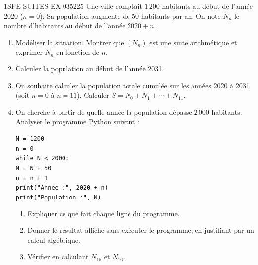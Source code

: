 \begin{exercice}{1SPE-SUITES-EX-035}{2}{25}
Une ville comptait $1\,200$ habitants au début de l'année 2020 ($n = 0$). Sa population augmente de $50$ habitants par an. On note $N_n$ le nombre d'habitants au début de l'année $2020 + n$.

\begin{enumerate}
  \item Modéliser la situation. Montrer que $(N_n)$ est une suite arithmétique et exprimer $N_n$ en fonction de $n$.

  \item Calculer la population au début de l'année 2031.

  \item On souhaite calculer la population totale cumulée sur les années 2020 à 2031 (soit $n = 0$ à $n = 11$). Calculer $S = N_0 + N_1 + \cdots + N_{11}$.

  \item On cherche à partir de quelle année la population dépasse $2\,000$ habitants. Analyser le programme Python suivant :

\medskip
\texttt{N = 1200}\\
\texttt{n = 0}\\
\texttt{while N < 2000:}\\
\hspace*{1.5em}\texttt{N = N + 50}\\
\hspace*{1.5em}\texttt{n = n + 1}\\
\texttt{print("Annee :", 2020 + n)}\\
\texttt{print("Population :", N)}

\medskip
  \begin{enumerate}
    \item Expliquer ce que fait chaque ligne du programme.
    \item Donner le résultat affiché sans exécuter le programme, en justifiant par un calcul algébrique.
    \item Vérifier en calculant $N_{15}$ et $N_{16}$.
  \end{enumerate}
\end{enumerate}
\end{exercice}
